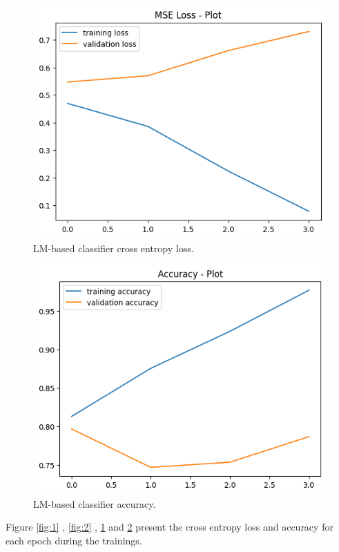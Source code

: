 \documentclass[11pt]{article}
\begin{document}
	\begin{figure}
		\includegraphics[width=\linewidth]{loss-yes-transformer.png}
		\caption{LM-based classifier cross entropy loss.}
		\label{fig:3}
	\end{figure}
	
	\begin{figure}
		\includegraphics[width=\linewidth]{accuracy-yes-transformer.png}
		\caption{LM-based classifier accuracy.}
		\label{fig:4}
	\end{figure}
	
	Figure \ref{fig:1} ,  \ref{fig:2} ,  \ref{fig:3}  and  \ref{fig:4} present the cross entropy
	loss and accuracy for each epoch during the trainings.
	
\end{document}
